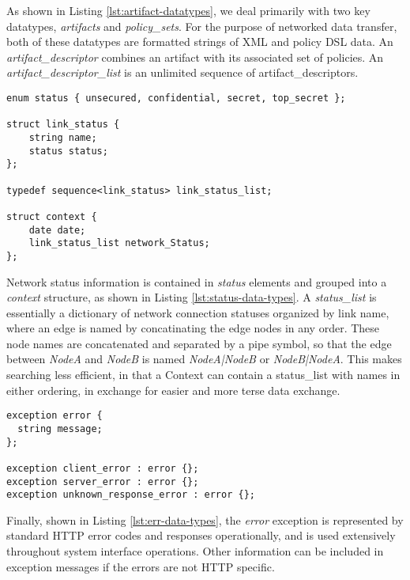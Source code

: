 As shown in Listing \ref{lst:artifact-datatypes}, we deal primarily with two key datatypes, \emph{artifacts} and \emph{policy\_sets}.  For the purpose of networked data transfer, both of these datatypes are formatted strings of XML and policy DSL data.  An \emph{artifact\_descriptor} combines an artifact with its associated set of policies.  An \emph{artifact\_descriptor\_list} is an unlimited sequence of artifact\_descriptors.

\begin{lstlisting}[language=idl, label=lst:status-data-types, caption=Key Status Dataypes]
enum status { unsecured, confidential, secret, top_secret };

struct link_status {
	string name;
	status status;
};

typedef sequence<link_status> link_status_list;

struct context {
	date date;
	link_status_list network_Status;
};
\end{lstlisting}

Network status information is contained in \emph{status} elements and grouped into a \emph{context} structure, as shown in Listing \ref{lst:status-data-types}.  A \emph{status\_list} is essentially a dictionary of network connection statuses organized by link name, where an edge is named by concatinating the edge nodes in any order.  These node names are concatenated and separated by a pipe symbol, so that the edge between \textit{NodeA} and \textit{NodeB} is named \textit{NodeA|NodeB} or \textit{NodeB|NodeA}.  This makes searching less efficient, in that a Context can contain a status\_list with names in either ordering, in exchange for easier and more terse data exchange.

\begin{lstlisting}[language=idl, label=lst:err-data-types, caption=Key Error Dataypes]
exception error {
  string message;
};

exception client_error : error {};
exception server_error : error {};
exception unknown_response_error : error {};
\end{lstlisting}

Finally, shown in Listing \ref{lst:err-data-types}, the \emph{error} exception is represented by standard HTTP error codes and responses operationally, and is used extensively throughout system interface operations.  Other information can be included in exception messages if the errors are not HTTP specific.

%

